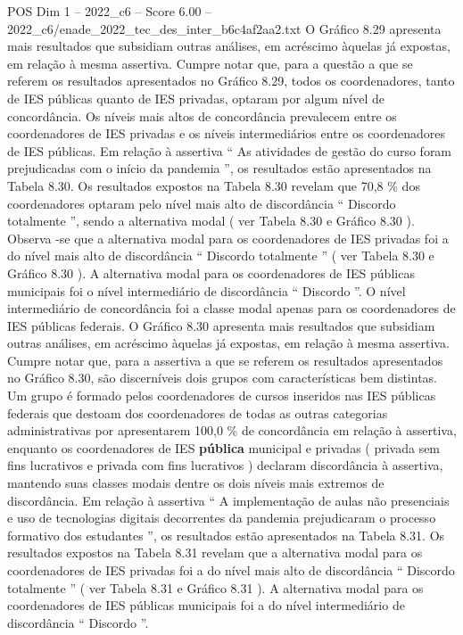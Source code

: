 \begin{textsample}{POS Dim 1 – 2022\_c6 – Score 6.00 – 2022\_c6/enade\_2022\_tec\_des\_inter\_b6c4af2aa2.txt}
O Gráfico 8.29 apresenta mais resultados que subsidiam outras análises, em acréscimo àquelas já expostas, em relação à mesma assertiva.
Cumpre notar que, para a questão a que se referem os resultados apresentados no Gráfico 8.29, todos os coordenadores, tanto de IES públicas quanto de IES privadas, optaram por algum nível de concordância.
Os níveis mais altos de concordância prevalecem entre os coordenadores de IES privadas e os níveis intermediários entre os coordenadores de IES públicas.
Em relação à assertiva “ As atividades de gestão do curso foram prejudicadas com o início da pandemia ”, os resultados estão apresentados na Tabela 8.30.
Os resultados expostos na Tabela 8.30 revelam que 70,8 \% dos coordenadores optaram pelo nível mais alto de discordância “ Discordo totalmente ”, sendo a alternativa modal ( ver Tabela 8.30 e Gráfico 8.30 ).
Observa -se que a alternativa modal para os coordenadores de IES privadas foi a do nível mais alto de discordância “ Discordo totalmente ” ( ver Tabela 8.30 e Gráfico 8.30 ).
A alternativa modal para os coordenadores de IES públicas municipais foi o nível intermediário de discordância “ Discordo ”.
O nível intermediário de concordância foi a classe modal apenas para os coordenadores de IES públicas federais.
O Gráfico 8.30 apresenta mais resultados que subsidiam outras análises, em acréscimo àquelas já expostas, em relação à mesma assertiva.
Cumpre notar que, para a assertiva a que se referem os resultados apresentados no Gráfico 8.30, são discerníveis dois grupos com características bem distintas.
Um grupo é formado pelos coordenadores de cursos inseridos nas IES públicas federais que destoam dos coordenadores de todas as outras categorias administrativas por apresentarem 100,0 \% de concordância em relação à assertiva, enquanto os coordenadores de IES \textbf{pública} municipal e privadas ( privada sem fins lucrativos e privada com fins lucrativos ) declaram discordância à assertiva, mantendo suas classes modais dentre os dois níveis mais extremos de discordância.
Em relação à assertiva “ A implementação de aulas não presenciais e uso de tecnologias digitais decorrentes da pandemia prejudicaram o processo formativo dos estudantes ”, os resultados estão apresentados na Tabela 8.31.
Os resultados expostos na Tabela 8.31 revelam que a alternativa modal para os coordenadores de IES privadas foi a do nível mais alto de discordância “ Discordo totalmente ” ( ver Tabela 8.31 e Gráfico 8.31 ).
A alternativa modal para os coordenadores de IES públicas municipais foi a do nível intermediário de discordância “ Discordo ”.

\end{textsample}
